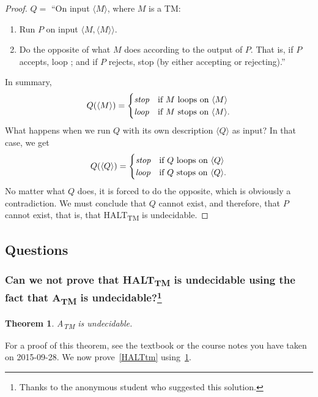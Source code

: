 \documentclass{article}
\newcommand{\theoremname}{Theorem}
\newtheorem{theorem}{\theoremname}
\newcommand{\TM}{TM}
\newcommand{\Atm}{A\textsubscript{TM}}
\newcommand{\HALTtm}{HALT\textsubscript{TM}}
\begin{document}
\begin{proof}
\(Q =\) ``On input \(\langle M \rangle\), where \(M\) is a \TM{}:
\begin{enumerate}
	\item Run \(P\) on input \(\langle M, \langle M \rangle \rangle\).
	\item Do the opposite of what \(M\) does according to the output of
		\(P\). That is, if \(P\) accepts, loop ; and if \(P\) rejects, stop (by
		either accepting or rejecting).''
\end{enumerate}
In summary,
\begin{displaymath}
	Q(\langle M\rangle) = \begin {cases}
	\emph{stop}&\text{if \(M\) loops on \(\langle M\rangle\)}\\
	\emph{loop}&\text{if \(M\) stops on \(\langle M\rangle\).}
\end{cases}
\end{displaymath}
What happens when we run \(Q\) with its own description \(\langle Q\rangle\) as input? In that
case, we get
\begin{displaymath}
Q(\langle Q\rangle) = \begin {cases}
\emph{stop}&\text{if \(Q\) loops on \(\langle Q\rangle\)}\\
\emph{loop}&\text{if \(Q\) stops on \(\langle Q\rangle\).}
\end{cases}
\end{displaymath}
No matter what \(Q\) does, it is forced to do the opposite, which is obviously a
contradiction. We must conclude that \(Q\) cannot exist, and therefore, that
\(P\) cannot exist, that is, that \HALTtm{} is undecidable.
\end{proof}
\subsection{Questions}
\subsubsection{Can we not prove that \HALTtm{} is undecidable using the fact
that \Atm{} is undecidable?\footnote{%
Thanks to the anonymous student who suggested this solution.%
}}

\begin{theorem}\label{Atm}
\Atm{} is undecidable.
\end{theorem}

For a proof of this theorem, see the textbook or the course notes you have taken
on 2015-09-28. We now prove~\ref{HALTtm} using~\ref{Atm}.
\end{document}
